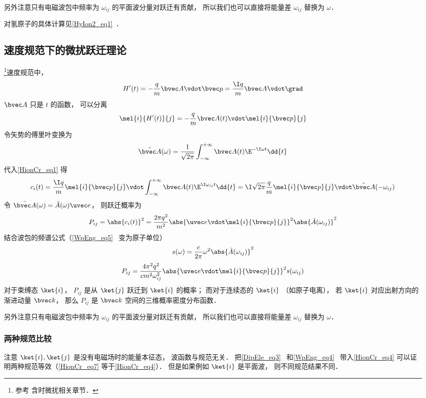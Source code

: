 另外注意只有电磁波包中频率为 $\omega_{ij}$ 的平面波分量对跃迁有贡献， 所以我们也可以直接将能量差 $\omega_{ij}$ 替换为 $\omega$．

对氢原子的具体计算见\autoref{HyIon2_eq1}~．

\subsection{速度规范下的微扰跃迁理论}
\footnote{参考\cite{Merzbacher} 含时微扰相关章节．}速度规范中，
\begin{equation}
H'(t) = -\frac{q}{m}\bvec A \vdot \bvec p = \frac{\I q}{m}\bvec A \vdot \grad
\end{equation}
$\bvec A$ 只是 $t$ 的函数， 可以分离
\begin{equation}
\mel{i}{H'(t)}{j} = -\frac{q}{m}\bvec A(t) \vdot \mel{i}{\bvec p}{j}
\end{equation}
令矢势的傅里叶变换为
\begin{equation}
\tilde {\bvec A}(\omega) = \frac{1}{\sqrt{2\pi}} \int_{-\infty}^{+\infty} \bvec A(t) \E^{-\I\omega t} \dd{t}
\end{equation}
代入\autoref{HionCr_eq1} 得
\begin{equation}\label{HionCr_eq4}
c_i(t) = \frac{\I q}{m} \mel{i}{\bvec p}{j} \vdot \int_{-\infty}^{+\infty}  \bvec A(t) \E^{\I\omega_{ij} t} \dd{t} = \I\sqrt{2\pi}\frac{q}{m} \mel{i}{\bvec p}{j} \vdot \tilde {\bvec A}(-\omega_{ij})
\end{equation}
令 $\tilde {\bvec A}(\omega) = \tilde {A}(\omega)\uvec e$， 则跃迁概率为
\begin{equation}\label{HionCr_eq3}
P_{ij} = \abs{c_i(t)}^2 = \frac{2\pi q^2}{m^2} \abs{\uvec e \vdot\mel{i}{\bvec p}{j}}^2 \abs{\tilde {A}(\omega_{ij})}^2
\end{equation}
结合波包的频谱公式（\autoref{WpEng_eq5}~ 变为原子单位）
\begin{equation}
s(\omega) = \frac{c}{2\pi} \omega^2 \abs{\tilde {A}(\omega_{ij})}^2
\end{equation}
\begin{equation}\label{HionCr_eq5}
P_{ij} = \frac{4\pi^2 q^2}{c m^2 \omega_{ij}^2} \abs{\uvec e \vdot\mel{i}{\bvec p}{j}}^2 s(\omega_{ij})
\end{equation}
对于束缚态 $\ket{i}$， $P_{ij}$ 是从 $\ket{j}$ 跃迁到 $\ket{i}$ 的概率； 而对于连续态的 $\ket{i}$ （如原子电离）， 若 $\ket{i}$ 对应出射方向的渐进动量 $\bvec k$， 那么 $P_{ij}$ 是 $\bvec k$ 空间的三维概率密度分布函数．

另外注意只有电磁波包中频率为 $\omega_{ij}$ 的平面波分量对跃迁有贡献， 所以我们也可以直接将能量差 $\omega_{ij}$ 替换为 $\omega$．

\subsubsection{两种规范比较}
注意 $\ket{i}, \ket{j}$ 是没有电磁场时的能量本征态， 波函数与规范无关． 把\autoref{DipEle_eq3}~ 和\autoref{WpEng_eq4}~ 带入\autoref{HionCr_eq4} 可以证明两种规范等效（\autoref{HionCr_eq7}  等于\autoref{HionCr_eq4}）． 但是如果例如 $\ket{i}$ 是平面波， 则不同规范结果不同．
